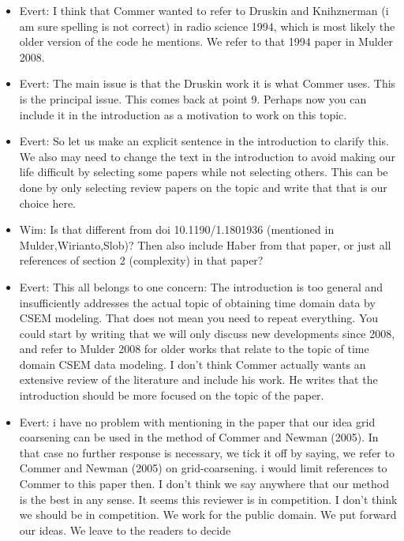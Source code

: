 \documentclass[onecolumn,extra,referee,camera]{gji}
\begin{document}
{\begin{itemize}
    suitable to be used. His second concern phrased as a recommendation: "Show
    results from a more complex model." after that the specific points come.
  \item Evert: I think that Commer wanted to refer to Druskin and Knihznerman
    (i am sure spelling is not correct) in radio science 1994, which is most
    likely the older version of the code he mentions. We refer to that 1994
    paper in Mulder 2008.
  \item Evert: The main issue is that the Druskin work it is what Commer uses.
    This is the principal issue. This comes back at point 9. Perhaps now you
    can include it in the introduction as a motivation to work on this topic.
  \item Evert: So let us make an explicit sentence in the introduction to
    clarify this. We also may need to change the text in the introduction to
    avoid making our life difficult by selecting some papers while not
    selecting others. This can be done by only selecting review papers on the
    topic and write that that is our choice here.
  \item Wim: Is that different from doi 10.1190/1.1801936 (mentioned in
    Mulder,Wirianto,Slob)? Then also include Haber from that paper, or just all
    references of section 2 (complexity) in that paper?
  \item Evert: This all belongs to one concern: The introduction is too general
    and insufficiently addresses the actual topic of obtaining time domain data
    by CSEM modeling. That does not mean you need to repeat everything. You
    could start by writing that we will only discuss new developments since
    2008, and refer to Mulder 2008 for older works that relate to the topic of
    time domain CSEM data modeling. I don't think Commer actually wants an
    extensive review of the literature and include his work. He writes that the
    introduction should be more focused on the topic of the paper.
  \item Evert: i have no problem with mentioning in the paper that our idea
    grid coarsening can be used in the method of Commer and Newman (2005). In
    that case no further response is necessary, we tick it off by saying, we
    refer to Commer and Newman (2005) on grid-coarsening. i would limit
    references to Commer to this paper then. I don't think we say anywhere that
    our method is the best in any sense. It seems this reviewer is in
    competition. I don't think we should be in competition. We work for the
    public domain. We put forward our ideas. We leave to the readers to decide

\end{itemize}}
\end{document}
